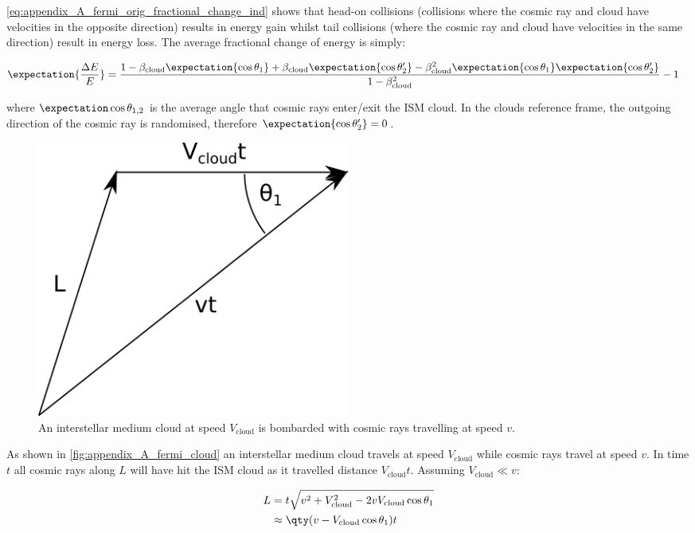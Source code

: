 \autoref{eq:appendix_A_fermi_orig_fractional_change_ind} shows that head-on collisions (collisions where the cosmic ray and cloud have velocities in the opposite direction) results in energy gain whilst tail collisions (where the cosmic ray and cloud have velocities in the same direction) result in energy loss. The average fractional change of energy is simply:

\begin{equation}
    \begin{aligned}
    \expectation{\frac{\Delta E}{E}}
	&=\frac{1-\beta_\text{cloud}\expectation{\cos\theta_1}+\beta_\text{cloud}\expectation{\cos\theta_2'}-\beta_\text{cloud}^2\expectation{\cos\theta_1}\expectation{\cos\theta_2'}}{1-\beta_\text{cloud}^2}-1
    \end{aligned} \label{eq:appendix_A_fermi_orig_fractional_change_av}
\end{equation}

\noindent where $\expectation\cos\theta_{1,2}$ is the average angle that cosmic rays enter/exit the ISM cloud. In the clouds reference frame, the outgoing direction of the cosmic ray is randomised, therefore $\expectation{\cos\theta_2'}=0$.

\begin{figure}
	\centering
    \includegraphics[width=0.5\textwidth]{A1_Supernova_Remnants/Images/fermi_1_collision_rate.png}
	\caption{An interstellar medium cloud at speed $V_\text{cloud}$ is bombarded with cosmic rays travelling at speed $v$.}
	\label{fig:appendix_A_fermi_cloud}
\end{figure}

As shown in \autoref{fig:appendix_A_fermi_cloud} an interstellar medium cloud travels at speed $V_\text{cloud}$ while cosmic rays travel at speed $v$. In time $t$ all cosmic rays along $L$ will have hit the ISM cloud as it travelled distance $V_\text{cloud}t$. Assuming $V_\text{cloud}\ll v$:

\begin{equation}
    \begin{aligned}
    L&=t\sqrt{v^2+V_\text{cloud}^2-2vV_\text{cloud}\cos\theta_1} \\
&\approx \qty(v-V_\text{cloud}\cos\theta_1)t
    \end{aligned}
\end{equation}

